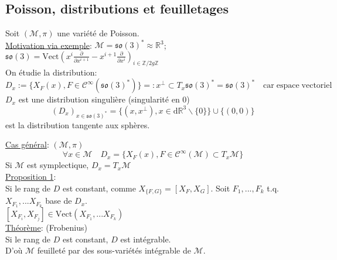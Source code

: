 \documentclass[a4paper,11pt]{article}
\renewcommand{\d}{{\mathrm{d}}}
\newcommand{\dr}[2]{\frac{\partial {#1}}{\partial{#2}}}
\begin{document}
\subsection{Poisson, distributions et feuilletages}
Soit $(\mathcal{M},\pi)$ une variété de Poisson.\\
\underline{Motivation via exemple}: $\mathcal{M}=\mathfrak{so}(3)^*\approx \mathbb{R}^3$; $\mathfrak{so}(3) = \mathrm{Vect}\left(x^i\dr{}{x^{i+1}}-x^{i+1}\dr{}{x^i}\right)_{i\in \mathbb{Z}/2g\mathbb{Z}}$\\
On étudie la distribution:
$$D_x := \big\{ X_F(x), F\in \mathcal{C}^\infty(\mathfrak{so}(3)^*)\big\}=: x^\perp\subset T_x \mathfrak{so}(3)^* = \mathfrak{so}(3)^* \quad \mathrm{car} \; \mathrm{espace}\; \mathrm{vectoriel}$$
$D_x$ est une distribution singulière (singularité en 0)
$$(D_x)_{x\in\mathfrak{so}(3)^*}=\big\{(x,x^\perp),x\in \d \mathbb{R}^3\backslash\{0\}\big\} \cup \{(0,0)\}$$
est la distribution tangente aux sphères.

\noindent\underline{Cas général}: $(\mathcal{M},\pi)$
$$\forall x\in \mathcal{M} \quad D_x = \{X_F(x), F\in \mathcal{C}^\infty(\mathcal{M})\subset T_x\mathcal{M}\}$$
Si $\mathcal{M}$ est symplectique, $D_x = T_x \mathcal{M}$\\

\noindent\underline{Proposition 1}:\\
Si le rang de $D$ est constant, comme $X_{\{F,G\}}=[X_F,X_G]$. Soit $F_1, ..., F_k$ t.q. $X_{F_1}, ... X_{F_k}$ base de $D_x$.\\
$[X_{F_i},X_{F_j}]\in \mathrm{Vect}(X_{F_1},...X_{F_k})$\\

\noindent\underline{Théorème}: (Frobenius)\\
Si le rang de $D$ est constant, $D$ est intégrable.\\
D'où $\mathcal{M}$ feuilleté par des sous-variétés intégrable de $\mathcal{M}$.\\
\end{document}
